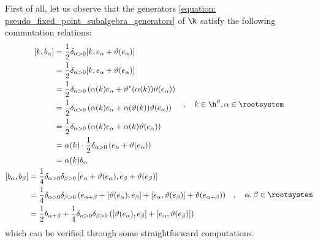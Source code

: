         First of all, let us observe that the generators \eqref{equation: pseudo_fixed_point_subalgebra_generators} of $\k$ satisfy the following commutation relations:
            \begin{equation} \label{equation: pseudo_fixed_point_subalgebra_relations}
                \begin{gathered}
                    \begin{aligned}
                        [k, b_{\alpha}] & = \frac12 \delta_{\alpha > 0} [ k, e_{\alpha} + \vartheta(e_{\alpha}) ]
                        \\
                        & = \frac12 \delta_{\alpha > 0} [ k, e_{\alpha} + \vartheta(e_{\alpha}) ]
                        \\
                        & = \frac12 \delta_{\alpha > 0} \left( \alpha(k) e_{\alpha} + \vartheta^*(\alpha(k)) \vartheta(e_{\alpha}) \right)
                        \\
                        & = \frac12 \delta_{\alpha > 0} \left( \alpha(k) e_{\alpha} + \alpha( \vartheta(k) ) \vartheta(e_{\alpha}) \right)
                        \\
                        & = \frac12 \delta_{\alpha > 0} \left( \alpha(k) e_{\alpha} + \alpha(k) \vartheta(e_{\alpha}) \right)
                        \\
                        & = \alpha(k) \cdot \frac12 \delta_{\alpha > 0} \left( e_{\alpha} + \vartheta(e_{\alpha}) \right)
                        \\
                        & = \alpha(k) b_{\alpha}
                    \end{aligned}
                    \quad, \quad k \in \h^{\vartheta}, \alpha \in \rootsystem
                    \\
                    \begin{aligned}
                        [b_{\alpha}, b_{\beta}] & = \frac14 \delta_{\alpha > 0} \delta_{\beta > 0} \left[ e_{\alpha} + \vartheta(e_{\alpha}), e_{\beta} + \vartheta(e_{\beta}) \right]
                        \\
                        & = \frac14 \delta_{\alpha > 0} \delta_{\beta > 0} \left( e_{\alpha + \beta} + [ \vartheta(e_{\alpha}), e_{\beta} ] + [ e_{\alpha}, \vartheta(e_{\beta}) ] + \vartheta(e_{\alpha + \beta}) \right)
                        \\
                        & = \frac12 b_{\alpha + \beta} + \frac14 \delta_{\alpha > 0} \delta_{\beta > 0} \left( [ \vartheta(e_{\alpha}), e_{\beta} ] + [ e_{\alpha}, \vartheta(e_{\beta}) ] \right)
                    \end{aligned}
                    \quad, \quad \alpha, \beta \in \rootsystem
                \end{gathered}
            \end{equation}
        which can be verified through some straightforward computations.

